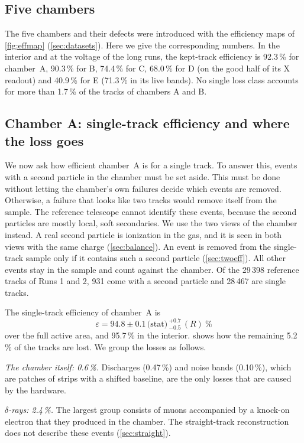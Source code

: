 \subsection{Five chambers}\label{sec:fleet}
The five chambers and their defects were introduced with the efficiency maps of \cref{fig:effmap}
(\cref{sec:datasets}). Here we give the corresponding numbers. In the interior and at the voltage of the long runs,
the kept-track efficiency is 92.3\,\% for chamber~A, 90.3\,\% for B, 74.4\,\% for C, 68.0\,\% for D (on the good half
of its X readout) and 40.9\,\% for E (71.3\,\% in its live bands). No single loss class accounts for more than
1.7\,\% of the tracks of chambers A and B.

\subsection{Chamber A: single-track efficiency and where the loss goes}\label{sec:single}
We now ask how efficient chamber~A is for a single track. To answer this, events with a second particle in the
chamber must be set aside. This must be done without letting the chamber's own failures decide which events are
removed. Otherwise, a failure that looks like two tracks would remove itself from the sample. The reference telescope
cannot identify these events, because the second particles are mostly local, soft secondaries. We use the two views of
the chamber instead. A real second particle is ionization in the gas, and it is seen in both views with the same
charge (\cref{sec:balance}). An event is removed from the single-track sample only if it contains such a second
particle (\cref{sec:twoeff}). All other events stay in the sample and count against the chamber. Of the 29\,398
reference tracks of Runs 1 and 2, 931 come with a second particle and 28\,467 are single tracks.

The single-track efficiency of chamber~A is
\[ \varepsilon=94.8\pm0.1\,\text{(stat)}\,^{+0.7}_{-0.5}\,(R)\ \%\]
over the full active area, and 95.7\,\% in the interior.  shows how the remaining 5.2\,\% of the
tracks are lost. We group the losses as follows.

\emph{The chamber itself: 0.6\,\%.} Discharges (0.47\,\%) and noise bands (0.10\,\%), which are patches of strips with
a shifted baseline, are the only losses that are caused by the hardware.

\emph{$\delta$-rays: 2.4\,\%.} The largest group consists of muons accompanied by a knock-on electron that they
produced in the chamber. The straight-track reconstruction does not describe these events (\cref{sec:straight}).

